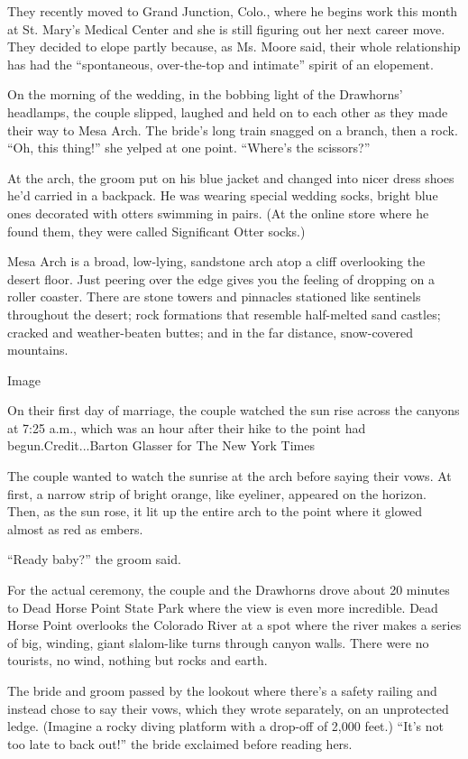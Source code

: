 They recently moved to Grand Junction, Colo., where he begins work this
month at St. Mary's Medical Center and she is still figuring out her
next career move. They decided to elope partly because, as Ms. Moore
said, their whole relationship has had the ``spontaneous, over-the-top
and intimate'' spirit of an elopement.

On the morning of the wedding, in the bobbing light of the Drawhorns'
headlamps, the couple slipped, laughed and held on to each other as they
made their way to Mesa Arch. The bride's long train snagged on a branch,
then a rock. ``Oh, this thing!'' she yelped at one point. ``Where's the
scissors?''

At the arch, the groom put on his blue jacket and changed into nicer
dress shoes he'd carried in a backpack. He was wearing special wedding
socks, bright blue ones decorated with otters swimming in pairs. (At the
online store where he found them, they were called Significant Otter
socks.)

Mesa Arch is a broad, low-lying, sandstone arch atop a cliff overlooking
the desert floor. Just peering over the edge gives you the feeling of
dropping on a roller coaster. There are stone towers and pinnacles
stationed like sentinels throughout the desert; rock formations that
resemble half-melted sand castles; cracked and weather-beaten buttes;
and in the far distance, snow-covered mountains.

Image

On their first day of marriage, the couple watched the sun rise across
the canyons at 7:25 a.m., which was an hour after their hike to the
point had begun.Credit...Barton Glasser for The New York Times

The couple wanted to watch the sunrise at the arch before saying their
vows. At first, a narrow strip of bright orange, like eyeliner, appeared
on the horizon. Then, as the sun rose, it lit up the entire arch to the
point where it glowed almost as red as embers.

``Ready baby?'' the groom said.

For the actual ceremony, the couple and the Drawhorns drove about 20
minutes to Dead Horse Point State Park where the view is even more
incredible. Dead Horse Point overlooks the Colorado River at a spot
where the river makes a series of big, winding, giant slalom-like turns
through canyon walls. There were no tourists, no wind, nothing but rocks
and earth.

The bride and groom passed by the lookout where there's a safety railing
and instead chose to say their vows, which they wrote separately, on an
unprotected ledge. (Imagine a rocky diving platform with a drop-off of
2,000 feet.) ``It's not too late to back out!'' the bride exclaimed
before reading hers.


